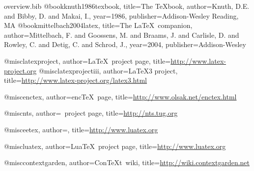 \documentclass{scrartcl}
\def\ConTeXt{Con\TeX{}t}
\begin{document}
\newpage

\begin{filecontents}{overview.bib}
@book{knuth1986texbook,
  title={{The \TeX book}},
  author={Knuth, D.E. and Bibby, D. and Makai, I.},
  year={1986},
  publisher={Addison-Wesley Reading, MA}
}
@book{mittelbach2004latex,
  title={{The \LaTeX\ companion}},
  author={Mittelbach, F. and Goossens, M. and Braams, J. and Carlisle, D. and Rowley, C. and Detig, C. and Schrod, J.},
  year={2004},
  publisher={Addison-Wesley}
}

@misc{latexproject,
  author={{\LaTeX\ project page}},
  title={\url{http://www.latex-project.org}}
}
@misc{latexprojectiii,
  author={{\LaTeX3 project}},
  title={\url{http://www.latex-project.org/latex3.html}}
}

@misc{enctex,
  author={{enc\TeX\ page}},
  title={\url{http://www.olsak.net/enctex.html}}
}

@misc{nts,
  author={{\NTS\ project page}},
  title={\url{http://nts.tug.org}}
}

@misc{eetex,
  author={{}},
  title={\url{http://www.luatex.org}}
}

@misc{luatex,
  author={{Lua\TeX\ project page}},
  title={\url{http://www.luatex.org}}
}

@misc{contextgarden,
  author={\ConTeXt\ wiki},
  title={\url{http://wiki.contextgarden.net}}
}

\end{filecontents}

\normalsize

\nocite{knuth1986texbook,latexproject,latexprojectiii,enctex,nts,luatex,contextgarden,mittelbach2004latex}

\end{document}
